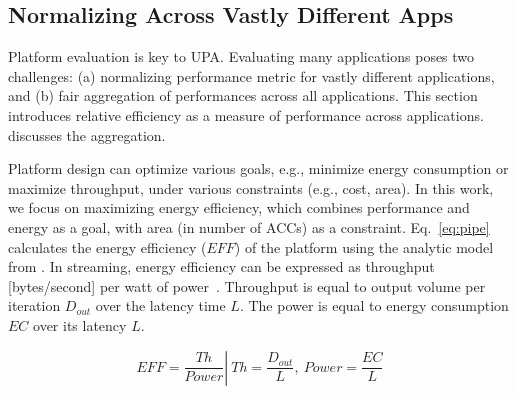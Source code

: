 \vspace{-2pt}
\subsection{Normalizing Across Vastly Different Apps}
\label{subsec:relativeEff}

Platform evaluation is key to UPA. Evaluating many applications poses two challenges: (a) normalizing performance metric for vastly different applications, and (b) fair aggregation of performances across all applications. This section introduces relative efficiency as a measure of performance across applications.  discusses the aggregation.

Platform design can optimize various goals, e.g., minimize energy consumption or maximize throughput, under various constraints (e.g., cost, area). In this work, we focus on maximizing energy efficiency, which combines performance and energy as a goal, with area (in number of ACCs) as a constraint. Eq.~\eqref{eq:pipe} calculates the energy efficiency ($EFF$) of the platform using the analytic model from . In streaming, energy efficiency can be expressed as throughput [bytes/second] per watt of power~\cite{zhou2013energy}. Throughput is equal to output volume per iteration $D_{out}$ over the latency time $L$. The power is equal to energy consumption $EC$ over its latency $L$. 

\vspace{-8pt}
\begin{equation}
	EFF = \left. \frac{Th}{Power} \right\vert\ Th = \frac{D_{out}}{L},\ Power = \frac{EC}{L}
\label{eq:pipe}
\end{equation}


